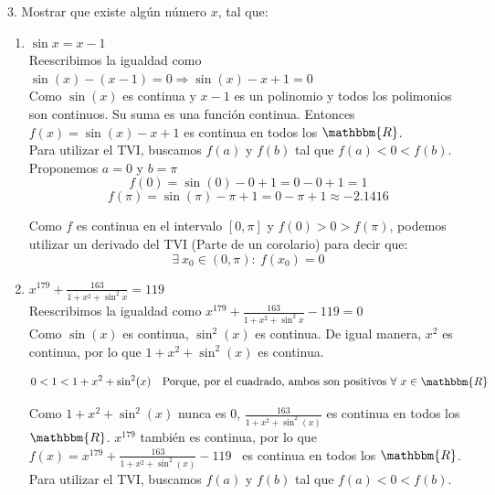 \documentclass[12pt]{article}
\begin{document}
3. Mostrar que existe algún número $x$, tal que:

\begin{enumerate}[\hspace{9px} a)]
    \item \(\sin x = x-1\)\\

        Reescribimos la igualdad como \(\sin(x)-(x-1)=0 \Longrightarrow \sin(x)-x+1=0\)\\

        Como $\sin(x)$ es continua y $x-1$ es un polinomio y todos los polimonios son continuos. Su suma es una función continua. Entonces \(f(x)=\sin(x)-x+1\) es continua en todos los $\mathbbm{R}$.\\

        Para utilizar el TVI, buscamos $f(a)$ y $f(b)$ tal que $f(a)<0<f(b)$.\\

        Proponemos $a=0$ y $b=\pi$
        \[f(0)=\sin(0)-0+1=0-0+1=1\]
        \[f(\pi)=\sin(\pi)-\pi+1=0-\pi+1 \approx -2.1416\]

        Como $f$ es continua en el intervalo $[0,\pi]$ y \(f(0)>0>f(\pi)\), podemos utilizar un derivado del TVI (Parte de un corolario) para decir que: \[\exists \ x_0 \in (0,\pi) : \ f(x_0)=0\]

    \item \(x^{179}+\displaystyle\frac{163}{1+x^2+\sin^2 x}=119\)\\

        Reescribimos la igualdad como \(x^{179}+\displaystyle\frac{163}{1+x^2+\sin^2 x}-119=0\)\\

        Como $\sin(x)$ es continua, $\sin^2(x)$ es continua. De igual manera, $x^2$ es continua, por lo que $1+x^2+\sin^2(x)$ es continua.

        \[0<1<1+x^2+\sin^2(x) \quad \text{Porque, por el cuadrado, ambos son positivos $\forall \ x \in \mathbbm{R}$}\]

        Como $1+x^2+\sin^2(x)$ nunca es 0, $\displaystyle\frac{163}{1+x^2+\sin^2(x)}$ es continua en todos los $\mathbbm{R}$. $x^{179}$ también es continua, por lo que \(f(x)=x^{179}+\displaystyle\frac{163}{1+x^2+\sin^2(x)}-119\) \ es continua en todos los $\mathbbm{R}$.\\

        Para utilizar el TVI, buscamos $f(a)$ y $f(b)$ tal que $f(a)<0<f(b)$.\\


\end{enumerate}
\end{document}

